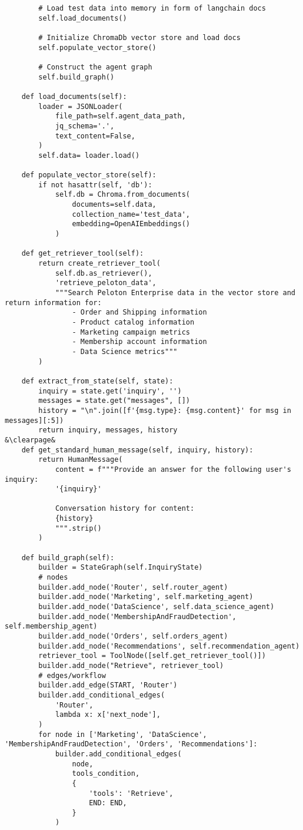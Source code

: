 \documentclass[11pt,letterpaper]{article}
\begin{document}
\begin{lstlisting}
        # Load test data into memory in form of langchain docs
        self.load_documents()

        # Initialize ChromaDb vector store and load docs
        self.populate_vector_store()

        # Construct the agent graph
        self.build_graph()

    def load_documents(self):
        loader = JSONLoader(
            file_path=self.agent_data_path, 
            jq_schema='.',
            text_content=False,
        )
        self.data= loader.load()

    def populate_vector_store(self):
        if not hasattr(self, 'db'):
            self.db = Chroma.from_documents(
                documents=self.data, 
                collection_name='test_data',
                embedding=OpenAIEmbeddings()
            )
    
    def get_retriever_tool(self):
        return create_retriever_tool(
            self.db.as_retriever(),
            'retrieve_peloton_data',
            """Search Peloton Enterprise data in the vector store and return information for:
                - Order and Shipping information
                - Product catalog information
                - Marketing campaign metrics
                - Membership account information
                - Data Science metrics"""
        )

    def extract_from_state(self, state):
        inquiry = state.get('inquiry', '')
        messages = state.get("messages", [])
        history = "\n".join([f'{msg.type}: {msg.content}' for msg in messages][:5])
        return inquiry, messages, history
&\clearpage&
    def get_standard_human_message(self, inquiry, history):
        return HumanMessage(
            content = f"""Provide an answer for the following user's inquiry: 
            '{inquiry}'

            Conversation history for content:
            {history}
            """.strip()
        )

    def build_graph(self):
        builder = StateGraph(self.InquiryState)
        # nodes
        builder.add_node('Router', self.router_agent)
        builder.add_node('Marketing', self.marketing_agent)
        builder.add_node('DataScience', self.data_science_agent)
        builder.add_node('MembershipAndFraudDetection', self.membership_agent)
        builder.add_node('Orders', self.orders_agent)
        builder.add_node('Recommendations', self.recommendation_agent)
        retriever_tool = ToolNode([self.get_retriever_tool()])
        builder.add_node("Retrieve", retriever_tool)
        # edges/workflow
        builder.add_edge(START, 'Router')
        builder.add_conditional_edges(
            'Router',
            lambda x: x['next_node'],
        )
        for node in ['Marketing', 'DataScience', 'MembershipAndFraudDetection', 'Orders', 'Recommendations']:
            builder.add_conditional_edges(
                node, 
                tools_condition,
                {
                    'tools': 'Retrieve',
                    END: END,
                }
            )
        

\end{lstlisting}
\end{document}
